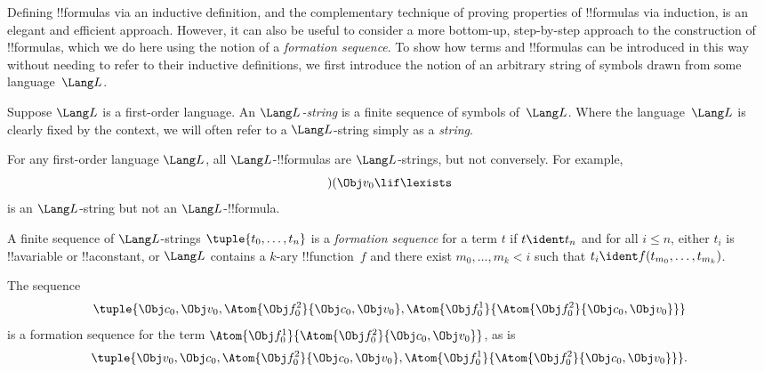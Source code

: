 \documentclass[../../../include/open-logic-section]{subfiles}
\begin{document}

Defining !!{formula}s via an inductive definition, and the
complementary technique of proving properties of !!{formula}s via
induction, is an elegant and efficient approach. However, it can
also be useful to consider a more bottom-up, step-by-step approach
to the construction of !!{formula}s, which we do here using the
notion of a \emph{formation sequence}.
%
To show how terms and !!{formula}s can be introduced in this way
without needing to refer to their inductive definitions, we first
introduce the notion of an arbitrary string of symbols drawn from
some language~$\Lang L$.

\begin{defn}[Strings]
Suppose $\Lang L$ is a first-order language. An \emph{$\Lang
L$-string} is a finite sequence of symbols of~$\Lang L$. Where the
language~$\Lang L$ is clearly fixed by the context, we will often
refer to a $\Lang L$-string simply as a \emph{string}.
\end{defn}

\begin{ex}
For any first-order language $\Lang L$, all
$\Lang L$-!!{formula}s are $\Lang L$-strings, but not
conversely. For example, \[)(\Obj v_0\lif\lexists\] is an
$\Lang L$-string but not an $\Lang L$-!!{formula}.
\end{ex}

\begin{defn}
A finite sequence of $\Lang L$-strings $\tuple{t_0,\dotsc,t_n}$ is a
\emph{formation sequence} for a term $t$ if $t \ident t_n$ and for all
$i \leq n$, either $t_i$ is !!a{variable} or !!a{constant}, or $\Lang
L$ contains a $k$-ary !!{function}~$f$ and there exist
$m_0,\dotsc,m_k < i$ such that $t_i \ident f(t_{m_0},\dotsc,t_{m_k})$.
\end{defn}

\begin{ex}
The sequence
\[
    \tuple{\Obj c_0, \Obj v_0, \Atom{\Obj f^2_0}{\Obj c_0, \Obj v_0}, \Atom{\Obj f^1_0}{\Atom{\Obj f^2_0}{\Obj c_0, \Obj v_0}}}
\]
is a formation sequence for the term $\Atom{\Obj f^1_0}{\Atom{\Obj
f^2_0}{\Obj c_0, \Obj v_0}}$, as is
\[
    \tuple{\Obj v_0, \Obj c_0, \Atom{\Obj f^2_0}{\Obj c_0, \Obj v_0}, \Atom{\Obj f^1_0}{\Atom{\Obj f^2_0}{\Obj c_0, \Obj v_0}}}.
\]
\end{ex}
\end{document}
